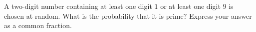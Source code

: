 A two-digit number containing at least one digit $1$ or at least one digit $9$ is chosen at random. What is the probability that it is prime? Express your answer as a common fraction.
